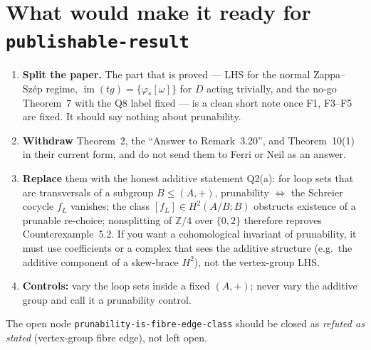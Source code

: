 \documentclass[11pt]{article}
\newcommand{\Z}{\mathbb{Z}}
\begin{document}
\section*{What would make it ready for \texttt{publishable-result}}
\begin{enumerate}[leftmargin=*]
\item \textbf{Split the paper.} The part that is proved --- LHS for the normal
  Zappa--Szép regime, $\operatorname{im}(tg)=\{\varphi_*[\omega]\}$ for $D$ acting trivially,
  and the no-go Theorem~7 with the Q8 label fixed --- is a clean short note once
  F1, F3--F5 are fixed. It should say nothing about prunability.
\item \textbf{Withdraw} Theorem~2, the ``Answer to Remark~3.20'', and Theorem~10(1)
  in their current form, and do not send them to Ferri or Neil as an answer.
\item \textbf{Replace} them with the honest additive statement Q2(a): for loop sets
  that are transversals of a subgroup $B\le(A,+)$, prunability $\iff$ the Schreier
  cocycle $f_L$ vanishes; the class $[f_L]\in H^2(A/B;B)$ obstructs existence of a
  prunable re-choice; nonsplitting of $\Z/4$ over $\{0,2\}$ therefore reproves
  Counterexample~5.2. If you want a cohomological invariant of prunability, it must
  use coefficients or a complex that sees the additive structure (e.g.\ the additive
  component of a skew-brace $H^2$), not the vertex-group LHS.
\item \textbf{Controls:} vary the loop sets inside a fixed $(A,+)$; never vary the
  additive group and call it a prunability control.
\end{enumerate}
The open node \texttt{prunability-is-fibre-edge-class} should be closed as
\emph{refuted as stated} (vertex-group fibre edge), not left open.
\end{document}
